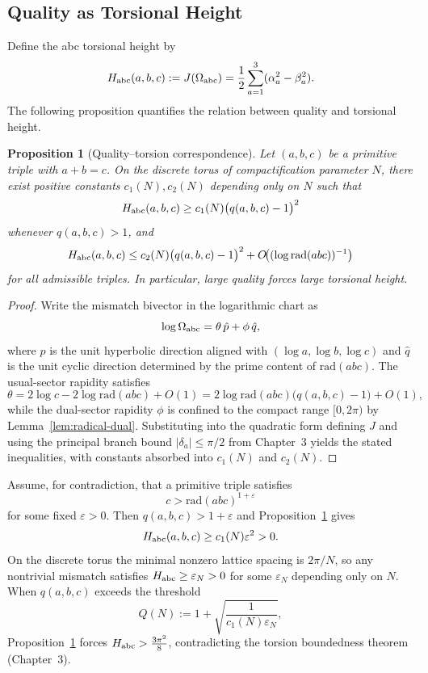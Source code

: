 \documentclass[dvipdfmx,a4paper]{article}
\newtheorem{proposition}[theorem]{Proposition}
\theoremstyle{definition}
\theoremstyle{remark}
\newcommand{\Jbound}{\frac{3\pi^2}{8}}
\begin{document}
\subsection{Quality as Torsional Height}

Define the abc torsional height by
\[
H_{\rm abc}(a,b,c) := J(\Omega_{\rm abc}) = \frac12 \sum_{a=1}^3 (\alpha_a^2 - \beta_a^2).
\]
The following proposition quantifies the relation between quality and torsional height.

\begin{proposition}[Quality--torsion correspondence]
\label{prop:quality-torsion}
Let \( (a,b,c) \) be a primitive triple with \( a + b = c \). On the discrete torus of compactification parameter \( N \), there exist positive constants \( c_1(N), c_2(N) \) depending only on \( N \) such that
\[
H_{\rm abc}(a,b,c) \geq c_1(N) \bigl( q(a,b,c) - 1 \bigr)^2
\]
whenever \( q(a,b,c) > 1 \), and
\[
H_{\rm abc}(a,b,c) \leq c_2(N) \bigl( q(a,b,c) - 1 \bigr)^2 + O\!\bigl( (\log \mathrm{rad}(abc))^{-1} \bigr)
\]
for all admissible triples. In particular, large quality forces large torsional height.
\end{proposition}

\begin{proof}
Write the mismatch bivector in the logarithmic chart as
\[
\log \Omega_{\rm abc} = \theta\, \hat{p} + \phi\, \hat{q},
\]
where \( \hat{p} \) is the unit hyperbolic direction aligned with \( (\log a, \log b, \log c) \) and \( \hat{q} \) is the unit cyclic direction determined by the prime content of \( \mathrm{rad}(abc) \). The usual-sector rapidity satisfies
\[
\theta = 2 \log c - 2 \log \mathrm{rad}(abc) + O(1) = 2 \log \mathrm{rad}(abc) \bigl( q(a,b,c) - 1 \bigr) + O(1),
\]
while the dual-sector rapidity \( \phi \) is confined to the compact range \( [0, 2\pi) \) by Lemma~\ref{lem:radical-dual}. Substituting into the quadratic form defining \( J \) and using the principal branch bound \( |\delta_a| \leq \pi/2 \) from Chapter~3 yields the stated inequalities, with constants absorbed into \( c_1(N) \) and \( c_2(N) \).
\end{proof}

Assume, for contradiction, that a primitive triple satisfies
\[
c > \mathrm{rad}(abc)^{1+\varepsilon}
\]
for some fixed \( \varepsilon > 0 \). Then \( q(a,b,c) > 1 + \varepsilon \) and Proposition~\ref{prop:quality-torsion} gives
\[
H_{\rm abc}(a,b,c) \geq c_1(N) \varepsilon^2 > 0.
\]
On the discrete torus the minimal nonzero lattice spacing is \( 2\pi/N \), so any nontrivial mismatch satisfies \( H_{\rm abc} \geq \varepsilon_N > 0 \) for some \( \varepsilon_N \) depending only on \( N \). When \( q(a,b,c) \) exceeds the threshold
\[
Q(N) := 1 + \sqrt{\frac{1}{c_1(N) \varepsilon_N}},
\]
Proposition~\ref{prop:quality-torsion} forces \( H_{\rm abc} > \Jbound \), contradicting the torsion boundedness theorem (Chapter~3).
\end{document}
